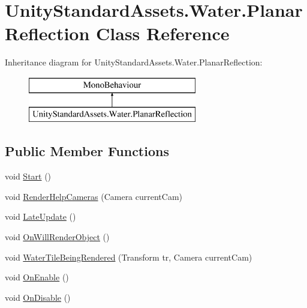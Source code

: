 \hypertarget{class_unity_standard_assets_1_1_water_1_1_planar_reflection}{}\section{Unity\+Standard\+Assets.\+Water.\+Planar\+Reflection Class Reference}
\label{class_unity_standard_assets_1_1_water_1_1_planar_reflection}
Inheritance diagram for Unity\+Standard\+Assets.\+Water.\+Planar\+Reflection\+:\begin{figure}[H]
\begin{center}
\leavevmode
\includegraphics[height=2.000000cm]{class_unity_standard_assets_1_1_water_1_1_planar_reflection}
\end{center}
\end{figure}
\subsection*{Public Member Functions}
\begin{DoxyCompactItemize}
\item 
void \mbox{\hyperlink{class_unity_standard_assets_1_1_water_1_1_planar_reflection_a47f6a478dc5d988c681479d0a96f3baf}{Start}} ()
\item 
void \mbox{\hyperlink{class_unity_standard_assets_1_1_water_1_1_planar_reflection_a8c8136a0d00227f4d93ce7e6a9676eac}{Render\+Help\+Cameras}} (Camera current\+Cam)
\item 
void \mbox{\hyperlink{class_unity_standard_assets_1_1_water_1_1_planar_reflection_a38cee17bffa51b0c7c6ab009b7db80d2}{Late\+Update}} ()
\item 
void \mbox{\hyperlink{class_unity_standard_assets_1_1_water_1_1_planar_reflection_a72229dc0077243d05f5b6ff3b4b82610}{On\+Will\+Render\+Object}} ()
\item 
void \mbox{\hyperlink{class_unity_standard_assets_1_1_water_1_1_planar_reflection_a0dc504b4e5d267a4ffb2b5227689f8da}{Water\+Tile\+Being\+Rendered}} (Transform tr, Camera current\+Cam)
\item 
void \mbox{\hyperlink{class_unity_standard_assets_1_1_water_1_1_planar_reflection_accfcd0dc698ac707a734e922fa9ab43f}{On\+Enable}} ()
\item 
void \mbox{\hyperlink{class_unity_standard_assets_1_1_water_1_1_planar_reflection_a06d5a20a07678c0cc1fd4face77a08f9}{On\+Disable}} ()
\end{DoxyCompactItemize}
